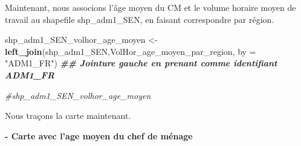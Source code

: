 \documentclass[
]{article}
\newenvironment{Shaded}{\begin{snugshade}}{\end{snugshade}}
\newcommand{\AttributeTok}[1]{\textcolor[rgb]{0.13,0.29,0.53}{#1}}
\newcommand{\CommentTok}[1]{\textcolor[rgb]{0.56,0.35,0.01}{\textit{#1}}}
\newcommand{\DocumentationTok}[1]{\textcolor[rgb]{0.56,0.35,0.01}{\textbf{\textit{#1}}}}
\newcommand{\FunctionTok}[1]{\textcolor[rgb]{0.13,0.29,0.53}{\textbf{#1}}}
\newcommand{\NormalTok}[1]{#1}
\newcommand{\OtherTok}[1]{\textcolor[rgb]{0.56,0.35,0.01}{#1}}
\newcommand{\StringTok}[1]{\textcolor[rgb]{0.31,0.60,0.02}{#1}}
\begin{document}
Maintenant, nous associons l'âge moyen du CM et le volume horaire moyen
de travail au shapefile shp\_adm1\_SEN, en faisant correspondre par
région.

\begin{Shaded}
\begin{Highlighting}[]
\NormalTok{shp\_adm1\_SEN\_volhor\_age\_moyen }\OtherTok{\textless{}{-}} \FunctionTok{left\_join}\NormalTok{(shp\_adm1\_SEN,VolHor\_age\_moyen\_par\_region, }\AttributeTok{by =} \StringTok{"ADM1\_FR"}\NormalTok{) }\DocumentationTok{\#\# Jointure gauche en prenant comme identifiant ADM1\_FR}

\CommentTok{\#shp\_adm1\_SEN\_volhor\_age\_moyen}
\end{Highlighting}
\end{Shaded}

Nous traçons la carte maintenant.

\textbf{- Carte avec l'age moyen du chef de ménage}
\end{document}

